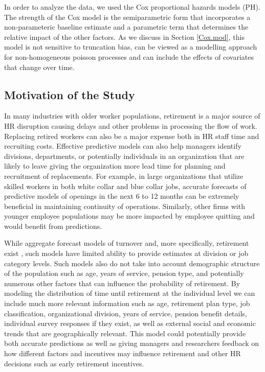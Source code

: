 \documentclass[12pt,letterpaper]{article}
\begin{document}
In order to analyze the data, we used the Cox proportional hazards models (PH).  The strength of the Cox model is the semiparametric form that incorporates a non-parameteric baseline estimate and a parametric term that determines the relative impact of the other factors. As we discuss in Section \ref{Cox.mod}, this model is not sensitive to truncation bias, can be viewed as a modelling approach for non-homogeneous poisson processes and can include the effects of covariates that change over time.


\subsection{Motivation of the Study}


In many industries with older worker populations, retirement is a major source of HR disruption causing delays and other problems in processing the flow of work.  Replacing retired workers can also be a major expense both in HR staff time and recruiting costs.  Effective predictive models can also help managers identify divisions, departments, or potentially individuals in an organization that are likely to leave giving the organization more lead time for planning and recruitment of replacements.  For example, in large organizations that utilize skilled workers in both white collar and blue collar jobs, accurate forecasts of predictive models of openings in the next 6 to 12 months can be extremely beneficial in maintaining continuity of operations.  Similarly, other firms with younger employee populations may be more impacted by employee quitting and would benefit from predictions.

While aggregate forecast models of turnover and, more specifically, retirement exist \citep{zhu2015}, such models have limited ability to provide estimates at division or job category levels.  Such models also do not take into account demographic structure of the population such as age, years of service, pension type, and potentially numerous other factors that can influence the probability of retirement.  By modeling the distribution of time until retirement at the individual level we can include much more relevant information such as age, retirement plan type, job classification, organizational division, years of service, pension benefit details, individual survey responses if they exist, as well as external social and economic trends that are geographically relevant.   This model could potentially provide both accurate predictions as well as giving managers and researchers feedback on how different factors and incentives may influence retirement and other HR decisions such as early retirement incentives.
\end{document}
